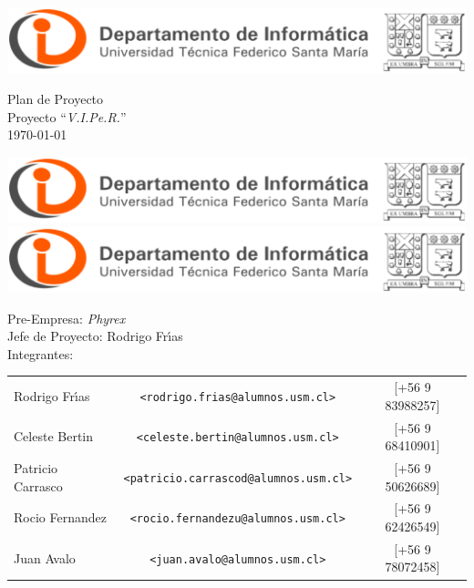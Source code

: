 \documentclass[letterpaper,12pt]{article} %
\numberwithin{equation}{section} %
\numberwithin{figure}{section} %
\numberwithin{table}{section} %
\begin{document}
\begin{titlepage} %
\thispagestyle{empty} %
\begin{center}
\includegraphics[scale=0.35]{logoUSM-DI.eps}
\end{center}

\vspace{3cm} %
\begin{center} %
  {
    \Huge Plan de Proyecto\\
    \huge Proyecto ``\emph{V.I.Pe.R.}''\\
    \normalsize\today
  }
\end{center}

\vspace{2cm}

\begin{center}
\includegraphics[scale=0.35]{logoUSM-DI.eps}\\
\includegraphics[scale=0.35]{logoUSM-DI.eps}
\end{center}

\vfill
\begin{flushleft} %
Pre-Empresa: \emph{Phyrex}\\
Jefe de Proyecto: Rodrigo Fr\'{\i}as\\
Integrantes:
\begin{table}[hb]
  \begin{tabular}{lcc}
    Rodrigo Fr\'{\i}as & \texttt{\small <rodrigo.frias@alumnos.usm.cl>} & [+56 9 83988257] \\
    Celeste Bertin & \texttt{\small <celeste.bertin@alumnos.usm.cl>} &[+56 9 68410901]\\
    Patricio Carrasco &\texttt{\small <patricio.carrascod@alumnos.usm.cl>} &[+56 9 50626689]\\
    Rocio Fernandez &\texttt{\small <rocio.fernandezu@alumnos.usm.cl>} & [+56 9 62426549]\\
    Juan Avalo & \texttt{\small <juan.avalo@alumnos.usm.cl>} & [+56 9 78072458]\\
  \end{tabular}
\end{table}
\end{flushleft}
\end{titlepage}
\end{document}
